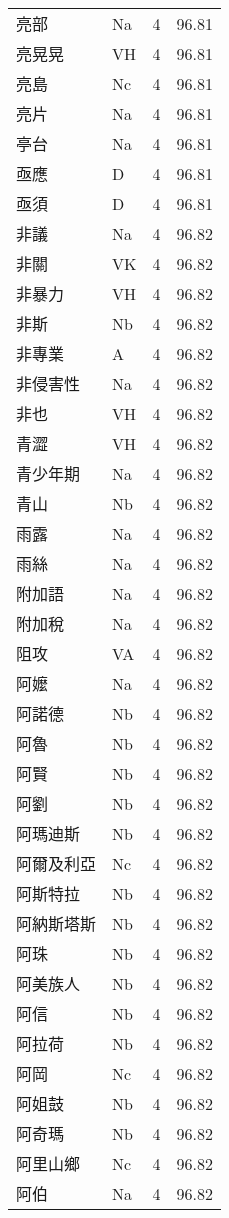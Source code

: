 \documentclass[twocolumn]{book}
\begin{document}
\begin{supertabular}{llrr}
亮部 & Na & 4 &  96.81\\
亮晃晃 & VH & 4 &  96.81\\
亮島 & Nc & 4 &  96.81\\
亮片 & Na & 4 &  96.81\\
亭台 & Na & 4 &  96.81\\
亟應 & D & 4 &  96.81\\
亟須 & D & 4 &  96.81\\
非議 & Na & 4 &  96.82\\
非關 & VK & 4 &  96.82\\
非暴力 & VH & 4 &  96.82\\
非斯 & Nb & 4 &  96.82\\
非專業 & A & 4 &  96.82\\
非侵害性 & Na & 4 &  96.82\\
非也 & VH & 4 &  96.82\\
青澀 & VH & 4 &  96.82\\
青少年期 & Na & 4 &  96.82\\
青山 & Nb & 4 &  96.82\\
雨露 & Na & 4 &  96.82\\
雨絲 & Na & 4 &  96.82\\
附加語 & Na & 4 &  96.82\\
附加稅 & Na & 4 &  96.82\\
阻攻 & VA & 4 &  96.82\\
阿嬤 & Na & 4 &  96.82\\
阿諾德 & Nb & 4 &  96.82\\
阿魯 & Nb & 4 &  96.82\\
阿賢 & Nb & 4 &  96.82\\
阿劉 & Nb & 4 &  96.82\\
阿瑪迪斯 & Nb & 4 &  96.82\\
阿爾及利亞 & Nc & 4 &  96.82\\
阿斯特拉 & Nb & 4 &  96.82\\
阿納斯塔斯 & Nb & 4 &  96.82\\
阿珠 & Nb & 4 &  96.82\\
阿美族人 & Nb & 4 &  96.82\\
阿信 & Nb & 4 &  96.82\\
阿拉荷 & Nb & 4 &  96.82\\
阿岡 & Nc & 4 &  96.82\\
阿姐鼓 & Nb & 4 &  96.82\\
阿奇瑪 & Nb & 4 &  96.82\\
阿里山鄉 & Nc & 4 &  96.82\\
阿伯 & Na & 4 &  96.82\\

\end{supertabular}
\end{document}
